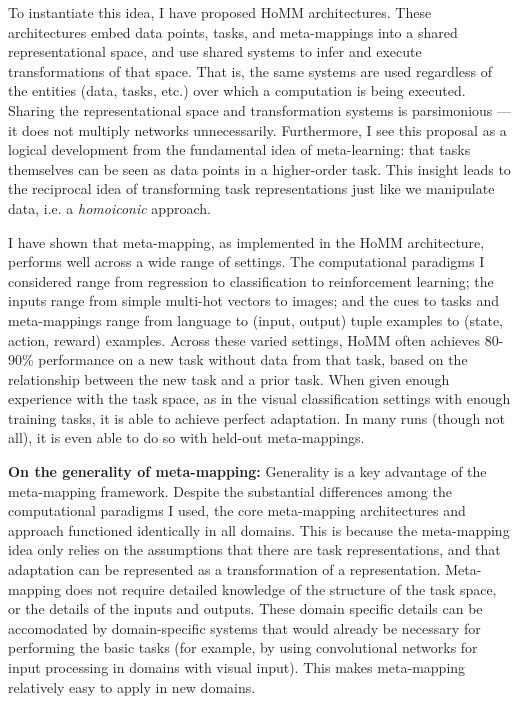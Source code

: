 To instantiate this idea, I have proposed HoMM architectures. These architectures embed data points, tasks, and meta-mappings into a shared representational space, and use shared systems to infer and execute transformations of that space. That is, the same systems are used regardless of the entities (data, tasks, etc.) over which a computation is being executed. Sharing the representational space and transformation systems is parsimonious --- it does not multiply networks unnecessarily. Furthermore, I see this proposal as a logical development from the fundamental idea of meta-learning: that tasks themselves can be seen as data points in a higher-order task. This insight leads to the reciprocal idea of transforming task representations just like we manipulate data, i.e. a \emph{homoiconic} approach. \par  

I have shown that meta-mapping, as implemented in the HoMM architecture, performs well across a wide range of settings. The computational paradigms I considered range from regression to classification to reinforcement learning; the inputs range from simple multi-hot vectors to images; and the cues to tasks and meta-mappings range from language to (input, output) tuple examples to (state, action, reward) examples. Across these varied settings, HoMM often achieves 80-90\% performance on a new task without data from that task, based on the relationship between the new task and a prior task. When given enough experience with the task space, as in the visual classification settings with enough training tasks, it is able to achieve perfect adaptation. In many runs (though not all), it is even able to do so with held-out meta-mappings. \par

\textbf{On the generality of meta-mapping:} Generality is a key advantage of the meta-mapping framework. Despite the substantial differences among the computational paradigms I used, the core meta-mapping architectures and approach functioned identically in all domains. This is because the meta-mapping idea only relies on the assumptions that there are task representations, and that adaptation can be represented as a transformation of a representation. Meta-mapping does not require detailed knowledge of the structure of the task space, or the details of the inputs and outputs. These domain specific details can be accomodated by domain-specific systems that would already be necessary for performing the basic tasks (for example, by using convolutional networks for input processing in domains with visual input). This makes meta-mapping relatively easy to apply in new domains. \par 

